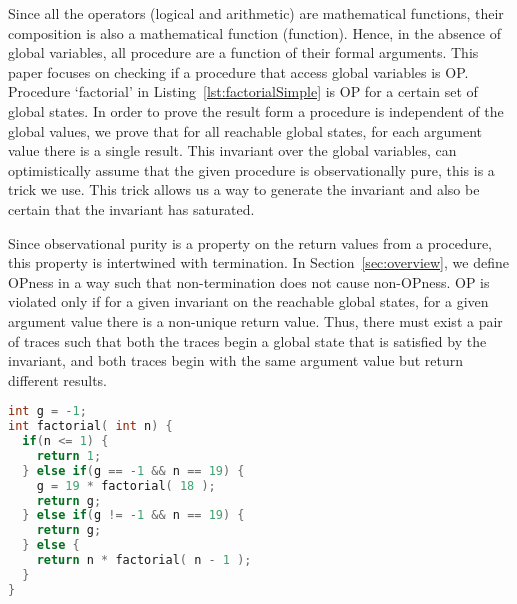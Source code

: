 \documentclass{llncs}
\begin{document}
Since all the operators (logical and arithmetic) are mathematical
functions, their composition is also a mathematical function
(function). Hence, in the absence of global variables, all procedure
are a function of their formal arguments. This paper focuses on
checking if a procedure that access global variables is OP. Procedure
`factorial' in Listing~\ref{lst:factorialSimple} is OP for a certain
set of global states.  In order to prove the result form a procedure
is independent of the global values, we prove that for all reachable
global states, for each argument value there is a single result. This
invariant over the global variables, can optimistically assume that
the given procedure is observationally pure, this is a trick we
use. This trick allows us a way to generate the invariant and also be
certain that the invariant has saturated. 



Since observational purity is a property on the return values from a
procedure, this property is intertwined with termination. In
Section~\ref{sec:overview}, we define OPness in a way such that
non-termination does not cause non-OPness. OP is violated only if for
a given invariant on the reachable global states, for a given argument
value there is a non-unique return value. Thus, there must exist a
pair of traces such that both the traces begin a global state that is
satisfied by the invariant, and both traces begin with the same
argument value but return different results.


\begin{lstlisting}[language=c, caption= {Procedure `factorial' :
      returns factorial of `n' and memoizes result for argument value
      `19'.}, label=lst:factorialSimple]
int g = -1;
int factorial( int n) {
  if(n <= 1) {
    return 1;
  } else if(g == -1 && n == 19) {
    g = 19 * factorial( 18 );
    return g;
  } else if(g != -1 && n == 19) {
    return g;
  } else {
    return n * factorial( n - 1 );
  }
}
\end{lstlisting}

\end{document}
